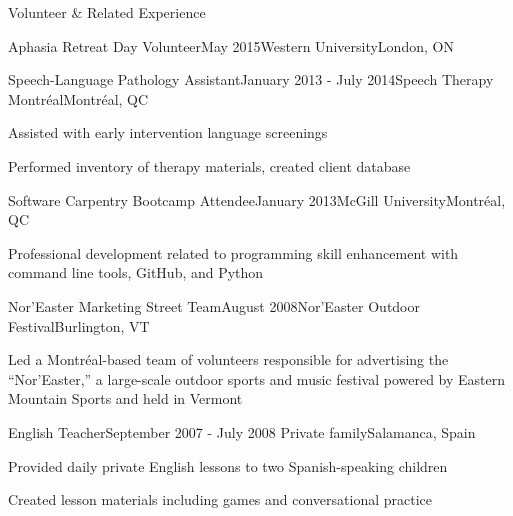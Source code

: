 \documentclass{resume} %
\begin{document}
\begin{rSection}{Volunteer \& Related Experience}
\begin{rSubsection}{Aphasia Retreat Day Volunteer}{May 2015}{Western University}{London, ON}
	\end{rSubsection}
	
	
	
	\begin{rSubsection}{Speech-Language Pathology Assistant}{January 2013 - July 2014}{Speech Therapy Montr\'eal}{Montr\'eal, QC}
	\item Assisted with early intervention language screenings
	\item Performed inventory of therapy materials, created client database
	\end{rSubsection}
	
	
	\begin{rSubsection}{Software Carpentry Bootcamp Attendee}{January 2013}{McGill University}{Montr\'eal, QC}
	\item Professional development related to programming skill enhancement with command line tools, GitHub, and Python
	\end{rSubsection}
	
	
	\begin{rSubsection}{Nor'Easter Marketing Street Team}{August 2008}{Nor'Easter Outdoor Festival}{Burlington, VT}
	\item Led a Montr\'eal-based team of volunteers responsible for advertising the ``Nor'Easter,'' a large-scale outdoor sports and music festival powered by Eastern Mountain Sports and held in Vermont
	\end{rSubsection}
	
	
	\begin{rSubsection}{English Teacher}{September 2007 - July 2008}{ Private family}{Salamanca, Spain}
	\item Provided daily private English lessons to two Spanish-speaking children
	\item Created lesson materials including games and conversational practice
	\end{rSubsection}
	

\end{rSection}



\end{document}
